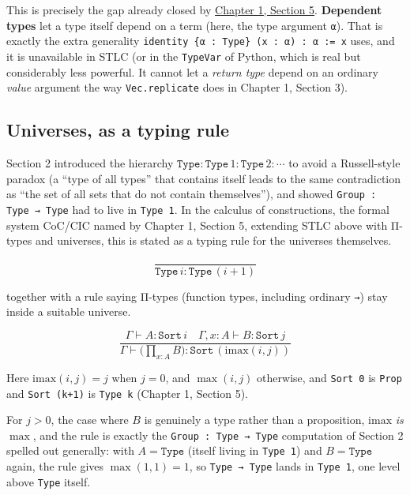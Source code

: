 This is precisely the gap already closed by \hyperref[sec:01-basics:05-pi-sigma-and-coc:1]{Chapter 1, Section 5}. \textbf{Dependent types} let a type itself depend on a term (here, the type argument \texttt{α}). That is exactly the extra generality \texttt{identity \{α : Type\} (x : α) : α := x} uses, and it is unavailable in STLC (or in the \texttt{TypeVar} of Python, which is real but considerably less powerful. It cannot let a \emph{return type} depend on an ordinary \emph{value} argument the way \texttt{Vec.replicate} does in Chapter 1, Section 3).

\subsection{Universes, as a typing rule}\label{sec:05-rigor-check:03-typing-rules-and-safety:6}

Section 2 introduced the hierarchy \(\mathtt{Type} : \mathtt{Type}\,1 : \mathtt{Type}\,2 : \cdots\) to avoid a Russell-style paradox (a ``type of all types'' that contains itself leads to the same contradiction as ``the set of all sets that do not contain themselves''), and showed \texttt{Group : Type → Type} had to live in \texttt{Type 1}. In the calculus of constructions, the formal system CoC/CIC named by Chapter 1, Section 5, extending STLC above with Π-types and universes, this is stated as a typing rule for the universes themselves.

\[
\dfrac{}{\mathtt{Type}\,i : \mathtt{Type}\,(i+1)}
\]

together with a rule saying Π-types (function types, including ordinary \texttt{→}) stay inside a suitable universe.

\[
\dfrac{\Gamma \vdash A : \mathtt{Sort}\,i \quad \Gamma, x:A \vdash B : \mathtt{Sort}\,j}
      {\Gamma \vdash \big(\textstyle\prod_{x:A} B\big) : \mathtt{Sort}\,(\mathrm{imax}(i,j))}
\]

Here \(\mathrm{imax}(i, j) = j\) when \(j = 0\), and \(\max(i, j)\) otherwise, and \texttt{Sort 0} is \texttt{Prop} and \texttt{Sort (k+1)} is \texttt{Type k} (Chapter 1, Section 5).

For \(j > 0\), the case where \(B\) is genuinely a type rather than a proposition, \(\mathrm{imax}\) \emph{is} \(\max\), and the rule is exactly the \texttt{Group : Type → Type} computation of Section 2 spelled out generally: with \(A = \mathtt{Type}\) (itself living in \texttt{Type 1}) and \(B = \mathtt{Type}\) again, the rule gives \(\max(1, 1) = 1\), so \texttt{Type → Type} lands in \texttt{Type 1}, one level above \texttt{Type} itself.

